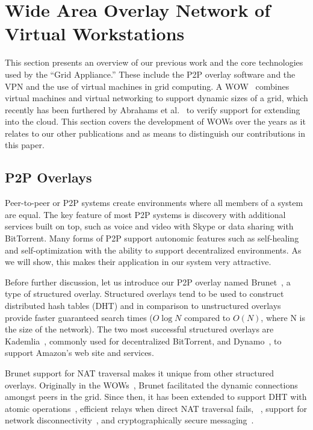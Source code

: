 \documentclass[conference]{IEEEtran}
\begin{document}
\section{Wide Area Overlay Network of Virtual Workstations}

This section presents an overview of our previous work and the core
technologies used by the ``Grid Appliance.''  These include the P2P overlay
software and the VPN and the use of virtual machines in grid computing.  A
WOW~\cite{wow} combines virtual machines and virtual networking to support
dynamic sizes of a grid, which recently has been furthered by Abrahams et
al.~\cite{ipop_cloud} to verify support for extending into the cloud.  This
section covers the development of WOWs over the years as it relates to our
other publications and as means to distinguish our contributions in this paper.

\subsection{P2P Overlays}

Peer-to-peer or P2P systems create environments where all members of a system
are equal.  The key feature of most P2P systems is discovery with additional
services built on top, such as voice and video with Skype or data sharing with
BitTorrent.  Many forms of P2P support autonomic features such as self-healing
and self-optimization with the ability to support decentralized environments.
As we will show, this makes their application in our system very attractive.

Before further discussion, let us introduce our P2P overlay named
Brunet~\cite{brunet}, a type of structured overlay.  Structured overlays tend
to be used to construct distributed hash tables (DHT) and in comparison to
unstructured overlays provide faster guaranteed search times ($O\log N$
compared to $O(N)$, where N is the size of the network).  The two most
successful structured overlays are Kademlia~\cite{kademlia}, commonly used for
decentralized BitTorrent, and Dynamo~\cite{dynamo}, to support Amazon's web
site and services.

Brunet support for NAT traversal makes it unique from other structured
overlays.  Originally in the WOWs~\cite{wow}, Brunet facilitated the dynamic
connections amongst peers in the grid.  Since then, it has been extended to
support DHT with atomic operations~\cite{pcgrid}, efficient relays when direct
NAT traversal fails, ~\cite{groupvpn}, support for network
disconnectivity~\cite{hpdc08}, and cryptographically secure
messaging~\cite{groupvpn}.
\end{document}
